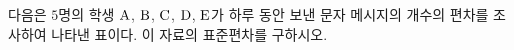 다음은 $5$명의 학생 $\mathrm{A}$, $\mathrm{B}$, $\mathrm{C}$, $\mathrm{D}$, $\mathrm{E}$가 하루 동안 보낸 문자 메시지의 개수의 편차를 조사하여 나타낸 표이다. 이 자료의 표준편차를 구하시오.
\par\smallskip\begin{center}\resizebox{\ifdim\width>\linewidth\linewidth\else\width\fi}{!}{}\end{center}
